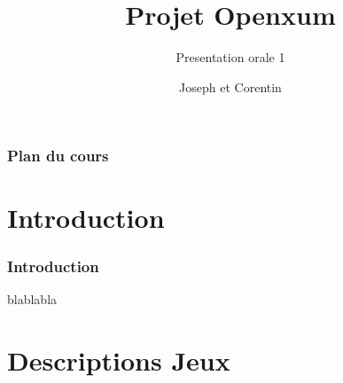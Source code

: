 \documentclass[11pt]{beamer}
\begin{document}
	
\author[J.Delaeter C.Ghyselinck]{Joseph  et Corentin }
\title{Projet Openxum}
\subtitle{Presentation orale 1}

  \begin{frame}
  \maketitle
  \end{frame}

  \begin{frame}
	\frametitle{Plan du cours}
	\tableofcontents
	\end{frame}
\section[Introduction]{Introduction}
  \begin{frame}
  \frametitle{Introduction}
  
  blablabla
  \end{frame}
\section[Description Jeux]{Descriptions Jeux} 
\end{document}
